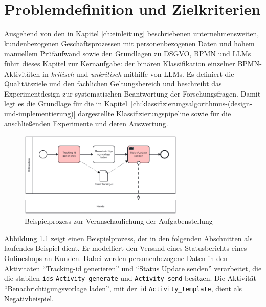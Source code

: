 \chapter{Problemdefinition und Zielkriterien}\label{ch:problemdefinition-und-zielkriterien}

Ausgehend von den in Kapitel \ref{ch:einleitung} beschriebenen unternehmensweiten, kundenbezogenen Geschäftsprozessen mit personenbezogenen Daten und hohem manuellem Prüfaufwand sowie den Grundlagen zu \ac{DSGVO}, \ac{BPMN} und \acp{LLM} führt dieses Kapitel zur Kernaufgabe: der binären Klassifikation einzelner \ac{BPMN}-Aktivitäten in \emph{kritisch} und \emph{unkritisch} mithilfe von \acp{LLM}. Es definiert die Qualitätsziele und den fachlichen Geltungsbereich und beschreibt das Experimentdesign zur systematischen Beantwortung der Forschungsfragen. Damit legt es die Grundlage für die in Kapitel~\ref{ch:klassifizierungsalgorithmus-(design-und-implementierung)} dargestellte Klassifizierungspipeline sowie für die anschließenden Experimente und deren Auswertung.

\begin{figure}[h]
    \centering
    \includegraphics[width=0.7\textwidth]{images/running_example}
    \caption{Beispielprozess zur Veranschaulichung der Aufgabenstellung}
    \label{fig:running_example}
\end{figure}

Abbildung \ref{fig:running_example} zeigt einen Beispielprozess, der in den folgenden Abschnitten als laufendes Beispiel dient. Er modelliert den Versand eines Statusberichts eines Onlineshops an Kunden. Dabei werden personenbezogene Daten in den Aktivitäten \enquote{Tracking-id generieren} und \enquote{Status Update senden} verarbeitet, die die stabilen \texttt{ids} \texttt{Activity\_generate} und \texttt{Activity\_send} besitzen. Die Aktivität \enquote{Benachrichtigungsvorlage laden}, mit der \texttt{id} \texttt{Activity\_template}, dient als Negativbeispiel.





